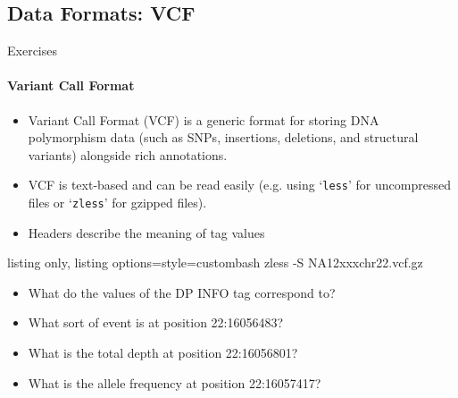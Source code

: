 \documentclass{beamer}
\begin{document}
\subsection{Data Formats: VCF}
\begin{frame}[fragile]{Exercises}
\framesubtitle{Variant Call Format}
\begin{itemize}
\item Variant Call Format (VCF) is a generic format for storing DNA polymorphism data (such as SNPs, insertions, deletions, and structural variants) alongside rich annotations.
\item VCF is text-based and can be read easily (e.g. using `\texttt{less}' for uncompressed files or `\texttt{zless}' for gzipped files).
\item Headers describe the meaning of tag values
\end{itemize}
\begin{tcblisting}{listing only, listing options={style=custombash}}
zless -S NA12xxxchr22.vcf.gz
\end{tcblisting}
\begin{itemize}
\item What do the values of the DP INFO tag correspond to?
\item What sort of event is at position 22:16056483?
\item What is the total depth at position 22:16056801?
\item What is the allele frequency at position 22:16057417?
\end{itemize}
\end{frame}
\end{document}
